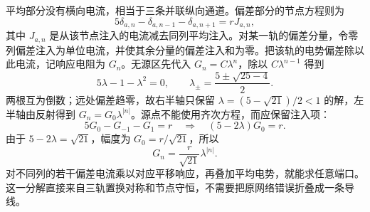 平均部分没有横向电流，相当于三条并联纵向通道。偏差部分的节点方程则为
\[
 5\delta_{a,n}-\delta_{a,n-1}-\delta_{a,n+1}=rJ_{a,n},
\]
其中 $J_{a,n}$ 是从该节点注入的电流减去同列平均注入。对某一轨的偏差分量，令零列偏差注入为单位电流，并使其余分量的偏差注入和为零。把该轨的电势偏差除以此电流，记响应电阻为 $G_n$。无源区先代入 $G_n=C\lambda^n$，除以 $C\lambda^{n-1}$ 得到
\[
 5\lambda-1-\lambda^2=0,\qquad
 \lambda_{\pm}=\frac{5\pm\sqrt{25-4}}2.
\]
两根互为倒数；远处偏差趋零，故右半轴只保留 $\lambda=(5-\sqrt{21})/2<1$ 的解，左半轴由反射得到 $G_n=G_0\lambda^{|n|}$。源点不能使用齐次方程，而应保留注入项：
\[
 5G_0-G_{-1}-G_1=r
 \quad\Longrightarrow\quad(5-2\lambda)G_0=r.
\]
由于 $5-2\lambda=\sqrt{21}$，幅度为 $G_0=r/\sqrt{21}$，所以
\[
 G_n=\frac{r}{\sqrt{21}}\lambda^{|n|}.
\]
对不同列的若干偏差电流乘以对应平移响应，再叠加平均电势，就能求任意端口。这一分解直接来自三轨置换对称和节点守恒，不需要把原网络错误折叠成一条导线。
